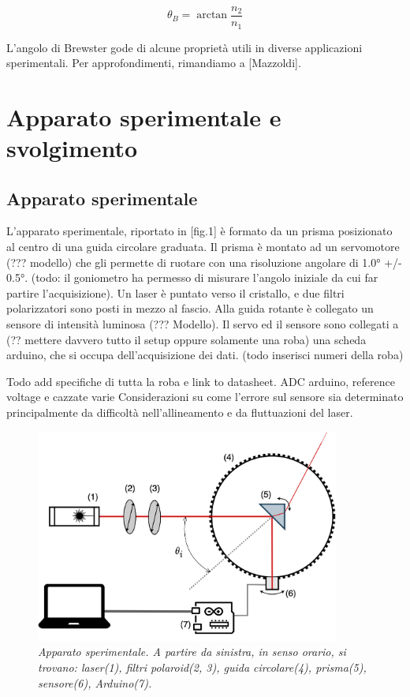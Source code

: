\documentclass[12pt, a4paper, twoside]{article}
\begin{document}
  \begin{equation}
    \theta_B = \arctan{
      \frac {n_2} {n_1}
    }\label{eq:Brewster's law}
  \end{equation}

 \noindent  L’angolo di Brewster gode di alcune proprietà utili in diverse applicazioni
  sperimentali.
  Per approfondimenti, rimandiamo a [Mazzoldi].



\section{Apparato sperimentale e svolgimento}\label{sec:apparato-sperimentale-e-svolgimento}
  \subsection{Apparato sperimentale}\label{subsec:apparato-sperimentale}
    L’apparato sperimentale, riportato in [fig.1] è formato da un prisma
    posizionato al centro di una guida circolare graduata. Il prisma è montato
    ad un servomotore (??? modello) che gli permette di ruotare con una
    risoluzione angolare di 1.0° +/- 0.5°. (todo: il goniometro ha permesso di
    misurare l’angolo iniziale da cui far partire l’acquisizione). Un laser è
    puntato verso il cristallo, e due filtri polarizzatori sono posti in mezzo
    al fascio. Alla guida rotante è collegato un sensore di intensità luminosa
    (??? Modello).
    Il servo ed il sensore sono collegati a (?? mettere davvero tutto il setup
    oppure solamente una roba) una scheda arduino, che si occupa dell’acquisizione
    dei dati.
    (todo inserisci numeri della roba)

    Todo add specifiche di tutta la roba e link to datasheet.
    ADC arduino, reference voltage e cazzate varie
    Considerazioni su come l’errore sul sensore sia determinato principalmente da difficoltà nell’allineamento e da fluttuazioni del laser.

    \begin{figure}[h]
      \centering
      \includegraphics[width=10cm]{instrumental-apparatus.png}
      \caption{
        \emph{
          Apparato sperimentale. A partire da sinistra, in senso orario,
          si trovano: laser(1), filtri polaroid(2, 3), guida circolare(4),
          prisma(5), sensore(6), Arduino(7).
        }
      }
      \label{fig:instrumental-apparatus}
    \end{figure}
\end{document}
